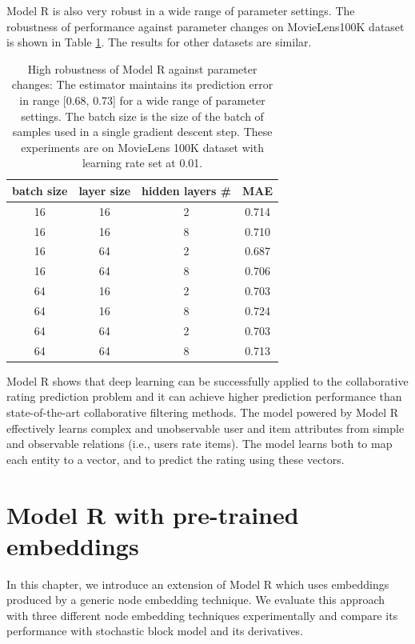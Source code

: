 \documentclass[12pt]{WSUThesis}
\theoremstyle{definition}
\begin{document}
Model R is also very robust in a wide range of parameter settings.
The robustness of performance against parameter changes on MovieLens100K dataset is shown in Table \ref{tab:robust}.
The results for other datasets are similar.
\begin{table}[!htb]
	\centering
	\caption{High robustness of Model R against parameter changes:
		The estimator maintains its prediction error in range [0.68, 0.73] for 
		a wide range of parameter settings. The batch size is the size of the 
		batch of samples used in a single gradient descent step.
		These experiments are on MovieLens 100K dataset with learning rate set 
		at 0.01.
	}
	\begin{tabular}{cccc}  \hline
		batch size & layer size & hidden layers \# & MAE \\ \hline
		16 & 16 & 2 & 0.714 \\ \hline
		16 & 16 & 8 & 0.710 \\ \hline
		16 & 64 & 2 & 0.687 \\ \hline
		16 & 64 & 8 & 0.706 \\ \hline
		64 & 16 & 2 & 0.703 \\ \hline
		64 & 16 & 8 & 0.724 \\ \hline
		64 & 64 & 2 & 0.703 \\ \hline
		64 & 64 & 8 & 0.713 \\ \hline
	\end{tabular}
	\label{tab:robust}
\end{table}
Model R shows that deep learning can be successfully applied to the collaborative rating prediction problem
and it can achieve higher prediction performance than  state-of-the-art collaborative filtering methods.
The model powered by Model R effectively learns complex and unobservable 
user and item attributes from simple and observable relations (i.e., users rate items).
The model learns both to map each entity to a vector, and to predict the rating using these vectors.

\chapter{Model R with pre-trained embeddings}
In this chapter, we introduce an extension of Model R which uses embeddings produced by a generic node embedding technique.
We evaluate this approach with three different node embedding techniques experimentally and compare its performance with stochastic block model and its derivatives.
\end{document}
